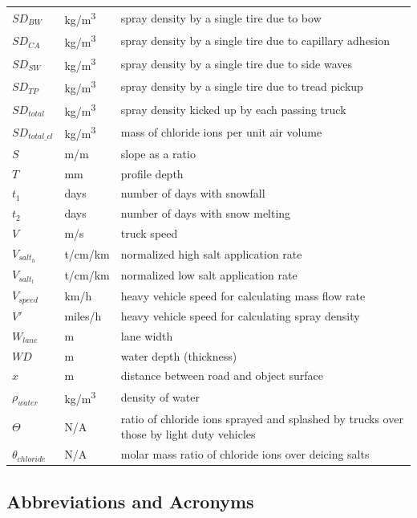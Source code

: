 \documentclass[12pt]{article}
\begin{document}
\begin{longtable*}{l l p{12cm}}
$\mathit{SD_{BW}}$ & \si{kg/m^{3}} & spray density by a single tire due to bow\\
$\mathit{SD_{CA}}$ & \si{kg/m^{3}} & spray density by a single tire due to capillary adhesion\\
$\mathit{SD_{SW}}$ & \si{kg/m^{3}} & spray density by a single tire due to side waves\\
$\mathit{SD_{TP}}$ & \si{kg/m^{3}} & spray density by a single tire due to tread pickup\\
$\mathit{SD_{total}}$ & \si{kg/m^{3}} & spray density kicked up by each passing truck\\
$\mathit{SD_{total\_cl}}$ & \si{kg/m^3} & mass of chloride ions per unit air volume\\
$S$ & \si{m/m} & slope as a ratio\\
$T$ & \si{mm} & profile depth\\
$t_1$ & days & number of days with snowfall\\
$t_2$ & days & number of days with snow melting\\
$V$ & \si{m/s} & truck speed\\
$V_{salt_{h}}$ & \si{t/cm/km} & normalized high salt application rate\\
$V_{salt_{l}}$ & \si{t/cm/km} & normalized low salt application rate\\
$V_{speed}$ & \si{km/h} & heavy vehicle speed for calculating mass flow rate\\
$V'$ & \si{miles/h} & heavy vehicle speed for calculating spray density\\ %
$W_{lane}$ & \si{m} & lane width\\
$\mathit{WD}$ & \si{m} & water depth (thickness)\\
$x$ & \si{m} & distance between road and object surface\\
$\rho_{water}$ & \si{kg/m^{3}} & density of water\\
$\Theta$ & N/A & ratio of chloride ions sprayed and splashed by trucks over those by light duty vehicles\\
$\theta_{chloride}$ & N/A & molar mass ratio of chloride ions over deicing salts\\
\bottomrule
\end{longtable*}
\subsection{Abbreviations and Acronyms}
\end{document}

